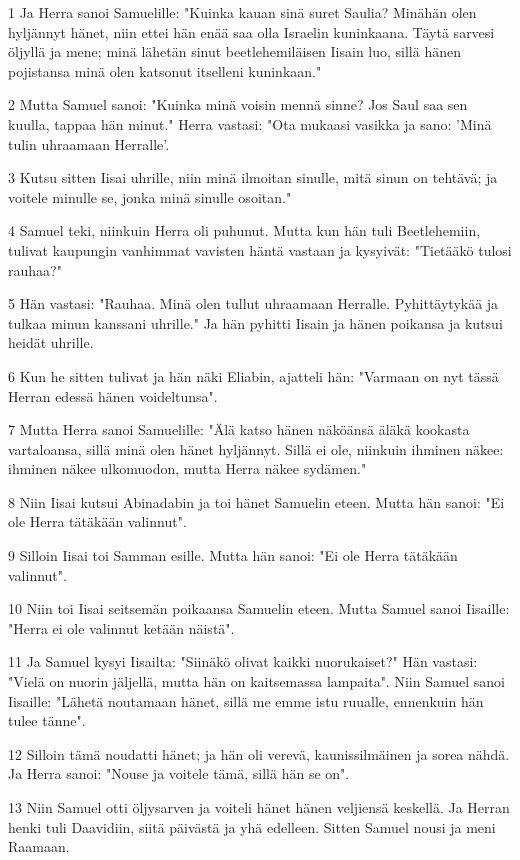 \par 1 Ja Herra sanoi Samuelille: "Kuinka kauan sinä suret Saulia? Minähän olen hyljännyt hänet, niin ettei hän enää saa olla Israelin kuninkaana. Täytä sarvesi öljyllä ja mene; minä lähetän sinut beetlehemiläisen Iisain luo, sillä hänen pojistansa minä olen katsonut itselleni kuninkaan."
\par 2 Mutta Samuel sanoi: "Kuinka minä voisin mennä sinne? Jos Saul saa sen kuulla, tappaa hän minut." Herra vastasi: "Ota mukaasi vasikka ja sano: 'Minä tulin uhraamaan Herralle'.
\par 3 Kutsu sitten Iisai uhrille, niin minä ilmoitan sinulle, mitä sinun on tehtävä; ja voitele minulle se, jonka minä sinulle osoitan."
\par 4 Samuel teki, niinkuin Herra oli puhunut. Mutta kun hän tuli Beetlehemiin, tulivat kaupungin vanhimmat vavisten häntä vastaan ja kysyivät: "Tietääkö tulosi rauhaa?"
\par 5 Hän vastasi: "Rauhaa. Minä olen tullut uhraamaan Herralle. Pyhittäytykää ja tulkaa minun kanssani uhrille." Ja hän pyhitti Iisain ja hänen poikansa ja kutsui heidät uhrille.
\par 6 Kun he sitten tulivat ja hän näki Eliabin, ajatteli hän: "Varmaan on nyt tässä Herran edessä hänen voideltunsa".
\par 7 Mutta Herra sanoi Samuelille: "Älä katso hänen näköänsä äläkä kookasta vartaloansa, sillä minä olen hänet hyljännyt. Sillä ei ole, niinkuin ihminen näkee: ihminen näkee ulkomuodon, mutta Herra näkee sydämen."
\par 8 Niin Iisai kutsui Abinadabin ja toi hänet Samuelin eteen. Mutta hän sanoi: "Ei ole Herra tätäkään valinnut".
\par 9 Silloin Iisai toi Samman esille. Mutta hän sanoi: "Ei ole Herra tätäkään valinnut".
\par 10 Niin toi Iisai seitsemän poikaansa Samuelin eteen. Mutta Samuel sanoi Iisaille: "Herra ei ole valinnut ketään näistä".
\par 11 Ja Samuel kysyi Iisailta: "Siinäkö olivat kaikki nuorukaiset?" Hän vastasi: "Vielä on nuorin jäljellä, mutta hän on kaitsemassa lampaita". Niin Samuel sanoi Iisaille: "Lähetä noutamaan hänet, sillä me emme istu ruualle, ennenkuin hän tulee tänne".
\par 12 Silloin tämä noudatti hänet; ja hän oli verevä, kaunissilmäinen ja sorea nähdä. Ja Herra sanoi: "Nouse ja voitele tämä, sillä hän se on".
\par 13 Niin Samuel otti öljysarven ja voiteli hänet hänen veljiensä keskellä. Ja Herran henki tuli Daavidiin, siitä päivästä ja yhä edelleen. Sitten Samuel nousi ja meni Raamaan.
